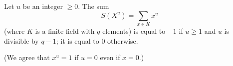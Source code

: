 Let $u$ be an integer $\geq 0$. The sum
$$S(X^u) = \sum_{x \in K} x^u$$
(where $K$ is a finite field with $q$ elements) is equal to $-1$ if $u \geq 1$ and $u$ is divisible by $q-1$; it is equal to $0$ otherwise.

(We agree that $x^u = 1$ if $u = 0$ even if $x = 0$.)
